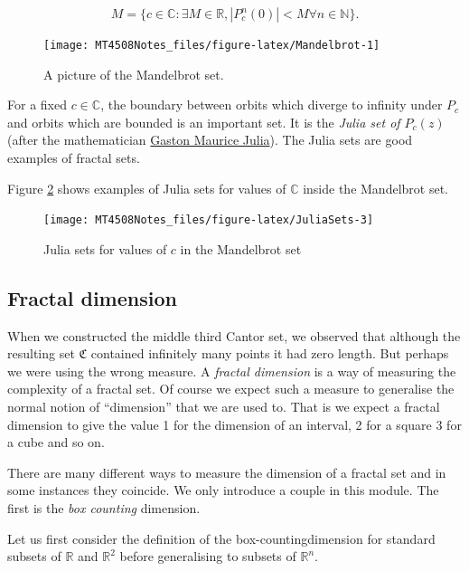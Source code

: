\documentclass[
  a4paper,
  oneside,
  final]{krantz}
\newcommand{\C}{\mathbb{C}}
\newcommand{\R}{\mathbb{R}}
\newcommand{\N}{\mathbb{N}}
\newcommand{\CC}{\mathfrak{C}}
\theoremstyle{definition}
\theoremstyle{definition}
\theoremstyle{definition}
\theoremstyle{definition}
\theoremstyle{remark}
\begin{document}
\[ M = \{ c \in \C: \exists M \in \R, |P_{c}^{n}(0)|< M \forall n \in \N \}.\]

\begin{figure}

{\centering \texttt{[image: MT4508Notes\_files/figure-latex/Mandelbrot-1]} 

}

\caption{A picture of the Mandelbrot set.}\label{fig:Mandelbrot}
\end{figure}

For a fixed \(c \in \C\), the boundary between orbits which diverge to infinity under \(P_{c}\) and orbits which are bounded is an important set. It is the \emph{Julia set of \(P_{c}(z)\)} (after the mathematician \href{https:mathshistory.st-andrews.ac.uk/Biographies/Julia}{Gaston Maurice Julia}). The Julia sets are good examples of fractal sets.

Figure \ref{fig:JuliaSets} shows examples of Julia sets for values of \(\C\) inside the Mandelbrot set.

\begin{figure}

{\centering \texttt{[image: MT4508Notes\_files/figure-latex/JuliaSets-3]} 

}

\caption{Julia sets for values of $c$ in the Mandelbrot set}\label{fig:JuliaSets}
\end{figure}

\hypertarget{fractaldim}{%
\subsection{Fractal dimension}\label{fractaldim}}

When we constructed the middle third Cantor set, we observed that although the resulting set \(\CC\) contained infinitely many points it had zero length. But perhaps we were using the wrong measure. A \emph{fractal dimension} is a way of measuring the complexity of a fractal set. Of course we expect such a measure to generalise the normal notion of ``dimension'' that we are used to. That is we expect a fractal dimension to give the value 1 for the dimension of an interval, 2 for a square 3 for a cube and so on.

There are many different ways to measure the dimension of a fractal set and in some instances they coincide. We only introduce a couple in this module. The first is the \emph{box counting} dimension.

Let us first consider the definition of the box-countingdimension for standard subsets of \(\R\) and \(\R^2\) before generalising to subsets of \(\R^n\).
\end{document}

